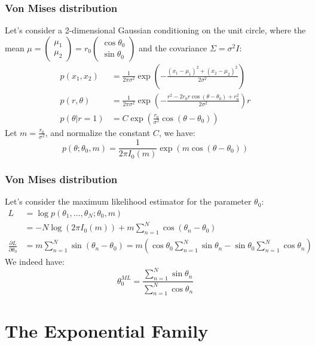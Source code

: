 \documentclass{beamer}
\begin{document}
\begin{frame}
    \frametitle{Von Mises distribution}
    Let's consider a 2-dimensional Gaussian conditioning on the unit circle, where the mean $\mu=\begin{pmatrix}
        \mu_{1}  \\
        \mu_{2}
    \end{pmatrix}=r_{0}
    \begin{pmatrix}
        \cos\theta_{0} \\
        \sin\theta_{0}
    \end{pmatrix}$ and the covariance $\Sigma=\sigma^{2}I$:
    \begin{align*}
        p(x_{1},x_{2})&=\frac{1}{2\pi\sigma^{2}}\exp(-\frac{(x_{1}-\mu_{1})^{2}+(x_{2}-\mu_{2})^{2}}{2\sigma^{2}}) \\
        p(r,\theta)&=\frac{1}{2\pi\sigma^{2}}\exp(-\frac{r^{2}-2r_{0}r\cos(\theta-\theta_{0})+r_{0}^{2}}{2\sigma^{2}})r \\
        p(\theta|r=1)&=C\exp(\frac{r_{0}}{\sigma^{2}}\cos(\theta-\theta_{0}))
    \end{align*}
    Let $m=\frac{r_{0}}{\sigma^{2}}$, and normalize the constant $C$, we have:
    \begin{equation*}
        p(\theta;\theta_{0},m)=\frac{1}{2\pi{}I_{0}(m)}\exp(m\cos(\theta-\theta_{0}))
    \end{equation*}
\end{frame}

\begin{frame}
    \frametitle{Von Mises distribution}
    Let's consider the maximum likelihood estimator for the parameter $\theta_{0}$:
    \begin{align*}
        L&=\log{}p(\theta_{1},\hdots,\theta_{N};\theta_{0},m) \\
        &=-N\log(2\pi{}I_{0}(m))+m\sum_{n=1}^{N}\cos(\theta_{n}-\theta_{0}) \\
        \frac{\partial{}L}{\partial\theta_{0}}&=m\sum_{n=1}^{N}\sin(\theta_{n}-\theta_{0})=m(\cos\theta_{0}\sum_{n=1}^{N}\sin\theta_{n}-\sin\theta_{0}\sum_{n=1}^{N}\cos\theta_{n})
    \end{align*}
    We indeed have:
    \begin{equation*}
        \theta_{0}^{ML}=\frac{\sum_{n=1}^{N}\sin\theta_{n}}{\sum_{n=1}^{N}\cos\theta_{n}}
    \end{equation*}
\end{frame}

\section{The Exponential Family}
\end{document}
